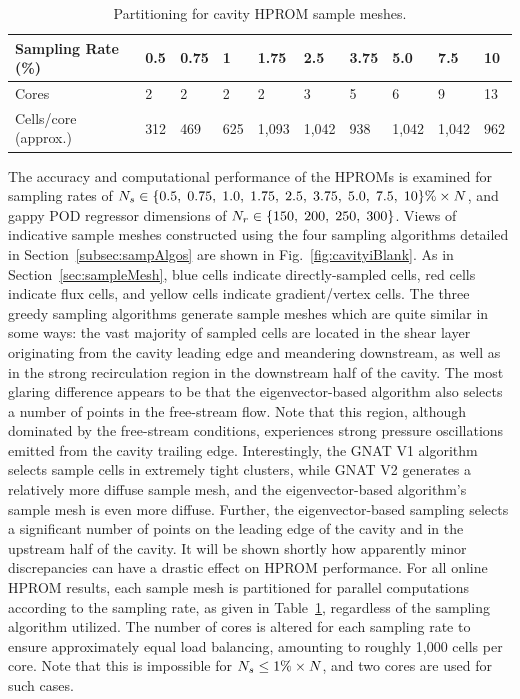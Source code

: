 \begin{table}
	\centering
	\begin{tabular}{ llllllllll }
	\toprule
	Sampling Rate (\%) & 0.5 & 0.75 & 1 & 1.75 & 2.5 & 3.75 & 5.0 & 7.5 & 10 \\
	\midrule
	Cores & 2 & 2 & 2 & 2 & 3 & 5 & 6 & 9 & 13 \\
	Cells/core (approx.) & 312 & 469 & 625 & 1,093 & 1,042 & 938 & 1,042 & 1,042 & 962 \\
	\bottomrule
	\end{tabular}
	\caption{\label{tab:cavitySampProcs}Partitioning for cavity HPROM sample meshes.}
\end{table}

The accuracy and computational performance of the HPROMs is examined for sampling rates of $N_s \in \{0.5, \; 0.75, \; 1.0, \; 1.75, \; 2.5, \; 3.75, \; 5.0, \; 7.5, \; 10\}\% \times N$, and gappy POD regressor dimensions of $N_r \in \{150, \; 200, \; 250, \; 300\}$. Views of indicative sample meshes constructed using the four sampling algorithms detailed in Section~\ref{subsec:sampAlgos} are shown in Fig.~\ref{fig:cavityiBlank}. As in Section~\ref{sec:sampleMesh}, blue cells indicate directly-sampled cells, red cells indicate flux cells, and yellow cells indicate gradient/vertex cells. The three greedy sampling algorithms generate sample meshes which are quite similar in some ways: the vast majority of sampled cells are located in the shear layer originating from the cavity leading edge and meandering downstream, as well as in the strong recirculation region in the downstream half of the cavity. The most glaring difference appears to be that the eigenvector-based algorithm also selects a number of points in the free-stream flow. Note that this region, although dominated by the free-stream conditions, experiences strong pressure oscillations emitted from the cavity trailing edge. Interestingly, the GNAT V1 algorithm selects sample cells in extremely tight clusters, while GNAT V2 generates a relatively more diffuse sample mesh, and the eigenvector-based algorithm's sample mesh is even more diffuse. Further, the eigenvector-based sampling selects a significant number of points on the leading edge of the cavity and in the upstream half of the cavity. It will be shown shortly how apparently minor discrepancies can have a drastic effect on HPROM performance. For all online HPROM results, each sample mesh is partitioned for parallel computations according to the sampling rate, as given in Table~\ref{tab:cavitySampProcs}, regardless of the sampling algorithm utilized. The number of cores is altered for each sampling rate to ensure approximately equal load balancing, amounting to roughly 1,000 cells per core. Note that this is impossible for $N_s \le 1\% \times N$, and two cores are used for such cases.

